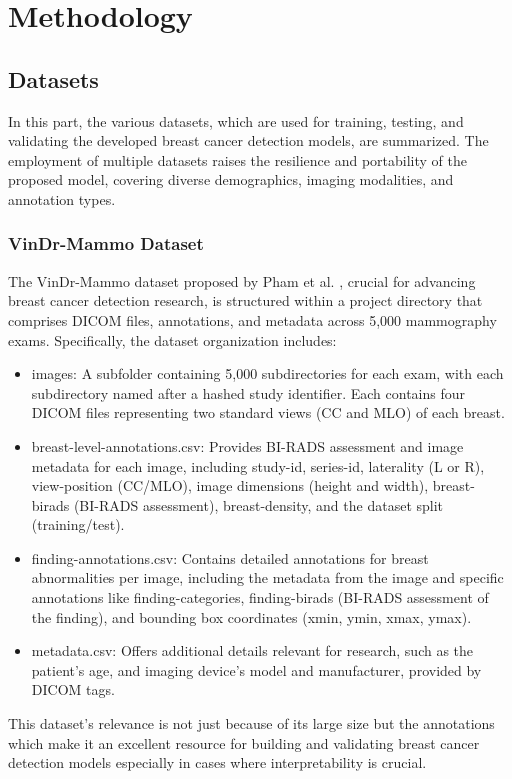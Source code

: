 \chapter{Methodology}
\label{chap3}
\section{Datasets}
In this part, the various datasets, which are used for training, testing, and validating the developed breast cancer detection models, are summarized. The employment of multiple datasets raises the resilience and portability of the proposed model, covering diverse demographics, imaging modalities, and annotation types.
\subsection{VinDr-Mammo Dataset}
The VinDr-Mammo dataset proposed by Pham et al. \cite{Vindir}, crucial for advancing breast cancer detection research, is structured within a project directory that comprises DICOM files, annotations, and metadata across 5,000 mammography exams. Specifically, the dataset organization includes:
\begin{itemize}
  \item images: A subfolder containing 5,000 subdirectories for each exam, with each subdirectory named after a hashed study identifier. Each contains four DICOM files representing two standard views (CC and MLO) of each breast.
  \item breast-level-annotations.csv: Provides BI-RADS assessment and image metadata for each image, including study-id, series-id, laterality (L or R), view-position (CC/MLO), image dimensions (height and width), breast-birads (BI-RADS assessment), breast-density, and the dataset split (training/test).
  \item finding-annotations.csv: Contains detailed annotations for breast abnormalities per image, including the metadata from the image and specific annotations like finding-categories, finding-birads (BI-RADS assessment of the finding), and bounding box coordinates (xmin, ymin, xmax, ymax).
  \item metadata.csv: Offers additional details relevant for research, such as the patient's age, and imaging device's model and manufacturer, provided by DICOM tags.
\end{itemize}
This dataset's relevance is not just because of its large size but the annotations which make it an excellent resource for building and validating breast cancer detection models especially in cases where interpretability is crucial.

